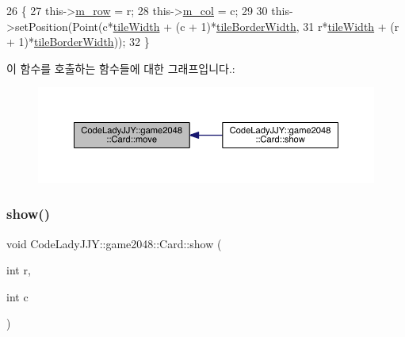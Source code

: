 \begin{DoxyCode}
26                            \{
27     this->\hyperlink{class_code_lady_j_j_y_1_1game2048_1_1_card_a9e7a544458a7112b974db9151ed6306c}{m\_row} = r;
28     this->\hyperlink{class_code_lady_j_j_y_1_1game2048_1_1_card_a236bc4d61f156c7c72fd7ed0cf6cb7c7}{m\_col} = c;
29 
30     this->setPosition(Point(c*\hyperlink{class_code_lady_j_j_y_1_1game2048_1_1_card_a42728102a89691f1449ca29afa47f713}{tileWidth} + (c + 1)*\hyperlink{class_code_lady_j_j_y_1_1game2048_1_1_card_a2d91cb1451103fcc94b456bb47f4288f}{tileBorderWidth},
31         r*\hyperlink{class_code_lady_j_j_y_1_1game2048_1_1_card_a42728102a89691f1449ca29afa47f713}{tileWidth} + (r + 1)*\hyperlink{class_code_lady_j_j_y_1_1game2048_1_1_card_a2d91cb1451103fcc94b456bb47f4288f}{tileBorderWidth}));
32 \}
\end{DoxyCode}
이 함수를 호출하는 함수들에 대한 그래프입니다.\+:
\nopagebreak
\begin{figure}[H]
\begin{center}
\leavevmode
\includegraphics[width=350pt]{d6/d12/class_code_lady_j_j_y_1_1game2048_1_1_card_a6ad341b10626a9cc1aafe8229fa61ea6_icgraph}
\end{center}
\end{figure}
\mbox{\label{class_code_lady_j_j_y_1_1game2048_1_1_card_abd3f3208867d1450ba4eeef3cef62d3f}} 
\subsubsection{\texorpdfstring{show()}{show()}}
{\footnotesize\ttfamily void Code\+Lady\+J\+J\+Y\+::game2048\+::\+Card\+::show (\begin{DoxyParamCaption}\item[{int}]{r,  }\item[{int}]{c }\end{DoxyParamCaption})\hspace{0.3cm}{\ttfamily [inline]}}



